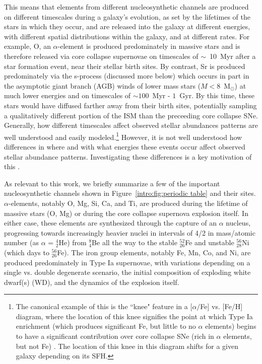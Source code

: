 This means that elements from different nucleosynthetic channels are produced on different timescales during a galaxy's evolution, as set by the lifetimes of the stars in which they occur, and are released into the galaxy at different energies, with different spatial distributions within the galaxy, and at different rates. For example, O, an $\alpha$-element is produced predominately in massive stars and is therefore released via core collapse supernovae on timescales of $\sim$~10~Myr after a star formation event, near their stellar birth sites. By contrast, Sr is produced predominately via the s-process (discussed more below) which occurs in part in the asymptotic giant branch (AGB) winds of lower mass stars ($M < 8$~M$_{\odot}$) at much lower energies and on timescales of $\sim 100$~Myr - $1$~Gyr. By this time, these stars would have diffused farther away from their birth sites, potentially sampling a qualitatively different portion of the ISM than the preceeding core collapse SNe. Generally, how different timescales affect observed stellar abundances patterns are well understood and easily modeled.\footnote{The canonical example of this is the ``knee" feature in a $[\alpha/$Fe] vs. [Fe/H] diagram, where the location of this knee signifies the point at which Type Ia enrichment (which produces significant Fe, but little to no $\alpha$ elements) begins to have a significant contribution over core collapse SNe (rich in $\alpha$ elements, but not Fe) \citep[e.g.[]{MatteucciBrocato1990, Geisler2005, Hill2018}. The location of this knee in this diagram shifts for a given galaxy depending on its SFH.} However, it is not well understood how differences in where and with what energies these events occur affect observed stellar abundance patterns. Investigating these differences is a key motivation of this \dissertation.

As relevant to this work, we briefly summarize a few of the important nucleosynthetic channels shown in Figure~\ref{intro:fig:periodic table} and their sites. $\alpha$-elements, notably O, Mg, Si, Ca, and Ti, are produced during the lifetime of massive stars (O, Mg) or during the core collapse supernova explosion itself. In either case, these elements are synthesized through the capture of an $\alpha$ nucleus, progressing towards increasingly heavier nuclei in intervals of 4/2 in mass/atomic number (as $\alpha$ = $^{4}_2$He) from $^8_4$Be all the way to the stable $^{52}_{26}$Fe and unstable $^{56}_{28}$Ni (which days to $^{56}_{26}$Fe). The iron group elements, notably Fe, Mn, Co, and Ni, are produced predominately in Type Ia supernovae, with variations depending on a single vs. double degenerate scenario, the initial composition of exploding white dwarf(s) (WD), and the dynamics of the explosion itself.

